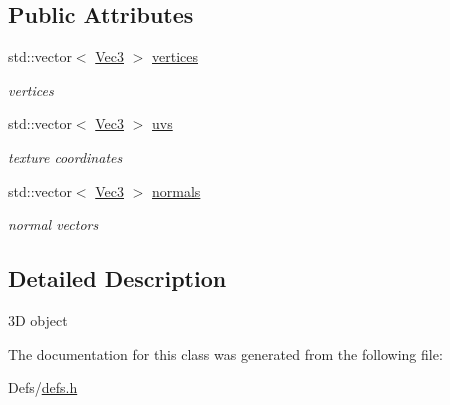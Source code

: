 \subsection*{Public Attributes}
\begin{DoxyCompactItemize}
\item 
std\+::vector$<$ \hyperlink{namespaceputar_a4c3cbb84a7c44d90796f404d9e2c10dc}{Vec3} $>$ \hyperlink{classputar_1_1Object3D_a98db9469ee89b49666fc0869534640dd}{vertices}\hypertarget{classputar_1_1Object3D_a98db9469ee89b49666fc0869534640dd}{}\label{classputar_1_1Object3D_a98db9469ee89b49666fc0869534640dd}

\begin{DoxyCompactList}\small\item\em vertices \end{DoxyCompactList}\item 
std\+::vector$<$ \hyperlink{namespaceputar_a4c3cbb84a7c44d90796f404d9e2c10dc}{Vec3} $>$ \hyperlink{classputar_1_1Object3D_abba256da57b53c6eee427645c75941fe}{uvs}\hypertarget{classputar_1_1Object3D_abba256da57b53c6eee427645c75941fe}{}\label{classputar_1_1Object3D_abba256da57b53c6eee427645c75941fe}

\begin{DoxyCompactList}\small\item\em texture coordinates \end{DoxyCompactList}\item 
std\+::vector$<$ \hyperlink{namespaceputar_a4c3cbb84a7c44d90796f404d9e2c10dc}{Vec3} $>$ \hyperlink{classputar_1_1Object3D_a1bba7733a918d59424e2fad741f6946a}{normals}\hypertarget{classputar_1_1Object3D_a1bba7733a918d59424e2fad741f6946a}{}\label{classputar_1_1Object3D_a1bba7733a918d59424e2fad741f6946a}

\begin{DoxyCompactList}\small\item\em normal vectors \end{DoxyCompactList}\end{DoxyCompactItemize}


\subsection{Detailed Description}
3D object 

The documentation for this class was generated from the following file\+:\begin{DoxyCompactItemize}
\item 
Defs/\hyperlink{defs_8h}{defs.\+h}\end{DoxyCompactItemize}
